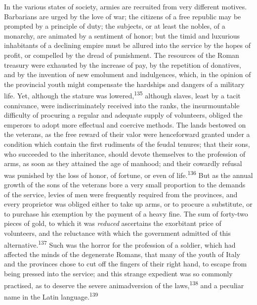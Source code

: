 



In the various states of society, armies are recruited from very
different motives. Barbarians are urged by the love of war; the
citizens of a free republic may be prompted by a principle of
duty; the subjects, or at least the nobles, of a monarchy, are
animated by a sentiment of honor; but the timid and luxurious
inhabitants of a declining empire must be allured into the
service by the hopes of profit, or compelled by the dread of
punishment. The resources of the Roman treasury were exhausted by
the increase of pay, by the repetition of donatives, and by the
invention of new emolument and indulgences, which, in the opinion
of the provincial youth might compensate the hardships and
dangers of a military life. Yet, although the stature was
lowered,\textsuperscript{135} although slaves, least by a tacit connivance, were
indiscriminately received into the ranks, the insurmountable
difficulty of procuring a regular and adequate supply of
volunteers, obliged the emperors to adopt more effectual and
coercive methods. The lands bestowed on the veterans, as the free
reward of their valor were henceforward granted under a condition
which contain the first rudiments of the feudal tenures; that
their sons, who succeeded to the inheritance, should devote
themselves to the profession of arms, as soon as they attained
the age of manhood; and their cowardly refusal was punished by
the loss of honor, of fortune, or even of life.\textsuperscript{136} But as the
annual growth of the sons of the veterans bore a very small
proportion to the demands of the service, levies of men were
frequently required from the provinces, and every proprietor was
obliged either to take up arms, or to procure a substitute, or to
purchase his exemption by the payment of a heavy fine. The sum of
forty-two pieces of gold, to which it was \textit{reduced} ascertains
the exorbitant price of volunteers, and the reluctance with which
the government admitted of this alternative.\textsuperscript{137} Such was the
horror for the profession of a soldier, which had affected the
minds of the degenerate Romans, that many of the youth of Italy
and the provinces chose to cut off the fingers of their right
hand, to escape from being pressed into the service; and this
strange expedient was so commonly practised, as to deserve the
severe animadversion of the laws,\textsuperscript{138} and a peculiar name in the
Latin language.\textsuperscript{139}

